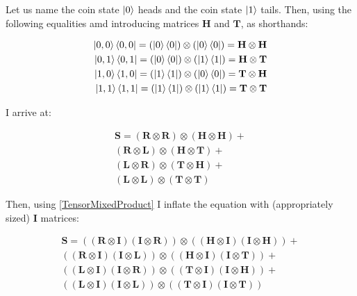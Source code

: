 Let us name the coin state $\ket{0}$ heads and the coin state $\ket{1}$ tails. Then, using the following equalities amd introducing matrices $\mathbf{H}$ and $\mathbf{T}$, as shorthands:

\begin{align*} 
    \ket{0,0}\bra{0,0} = (\ket{0}\bra{0}) \otimes (\ket{0}\bra{0}) = \mathbf{H} \otimes \mathbf{H} \\
    \ket{0,1}\bra{0,1} = (\ket{0}\bra{0}) \otimes (\ket{1}\bra{1}) = \mathbf{H} \otimes \mathbf{T} \\
    \ket{1,0}\bra{1,0} = (\ket{1}\bra{1}) \otimes (\ket{0}\bra{0}) = \mathbf{T} \otimes \mathbf{H} \\
    \ket{1,1}\bra{1,1} = (\ket{1}\bra{1}) \otimes (\ket{1}\bra{1}) = \mathbf{T} \otimes \mathbf{T}
\end{align*}

I arrive at:

\begin{align*} 
    \mathbf{S} =   
    (\mathbf{R} \otimes \mathbf{R}) \otimes (\mathbf{H} \otimes \mathbf{H}) + \\
    (\mathbf{R} \otimes \mathbf{L}) \otimes (\mathbf{H} \otimes \mathbf{T}) + \\
    (\mathbf{L} \otimes \mathbf{R}) \otimes (\mathbf{T} \otimes \mathbf{H}) + \\
    (\mathbf{L} \otimes \mathbf{L}) \otimes (\mathbf{T} \otimes \mathbf{T})\phantom{+}
\end{align*}

Then, using \hyperref[TensorMixedProduct]{[TensorMixedProduct]} I inflate the equation with (appropriately sized) $\mathbf{I}$ matrices:

\begin{align*} 
    \mathbf{S} =   
    ((\mathbf{R} \otimes \mathbf{I})(\mathbf{I} \otimes \mathbf{R})) \otimes ((\mathbf{H} \otimes \mathbf{I}) (\mathbf{I} \otimes \mathbf{H})) + \\
    ((\mathbf{R} \otimes \mathbf{I})(\mathbf{I} \otimes \mathbf{L})) \otimes ((\mathbf{H} \otimes \mathbf{I}) (\mathbf{I} \otimes \mathbf{T})) + \\
    ((\mathbf{L} \otimes \mathbf{I})(\mathbf{I} \otimes \mathbf{R})) \otimes ((\mathbf{T} \otimes \mathbf{I}) (\mathbf{I} \otimes \mathbf{H})) + \\
    ((\mathbf{L} \otimes \mathbf{I})(\mathbf{I} \otimes \mathbf{L})) \otimes ((\mathbf{T} \otimes \mathbf{I}) (\mathbf{I} \otimes \mathbf{T}))\phantom{+}
\end{align*}

